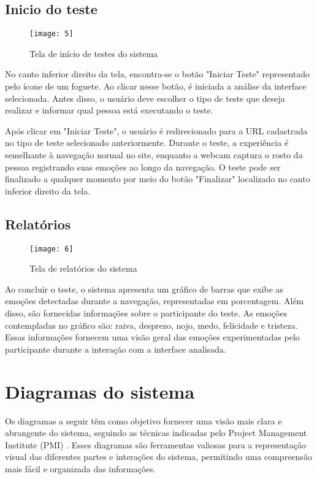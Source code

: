 \clearpage
\subsection{Inicio do teste}

\begin{figure}[h]
  \caption{Tela de início de testes do sistema}
  \centering
  \texttt{[image: 5]}
  \label{fig:5}
\end{figure}
\FloatBarrier

No canto inferior direito da tela, encontra-se o botão "Iniciar Teste" representado pelo ícone de um foguete. Ao clicar nesse botão, é iniciada a análise da interface selecionada. Antes disso, o usuário deve escolher o tipo de teste que deseja realizar e informar qual pessoa está executando o teste.

Após clicar em "Iniciar Teste", o usuário é redirecionado para a URL cadastrada no tipo de teste selecionado anteriormente. Durante o teste, a experiência é semelhante à navegação normal no site, enquanto a webcam captura o rosto da pessoa registrando suas emoções ao longo da navegação. O teste pode ser finalizado a qualquer momento por meio do botão "Finalizar" localizado no canto inferior direito da tela.

\subsection{Relatórios}

\begin{figure}[h]
  \caption{Tela de relatórios do sistema}
  \centering
  \texttt{[image: 6]}
  \label{fig:6}
\end{figure}
\FloatBarrier

Ao concluir o teste, o sistema apresenta um gráfico de barras que exibe as emoções detectadas durante a navegação, representadas em porcentagem. Além disso, são fornecidas informações sobre o participante do teste. As emoções contempladas no gráfico são: raiva, desprezo, nojo, medo, felicidade e tristeza. Essas informações fornecem uma visão geral das emoções experimentadas pelo participante durante a interação com a interface analisada.

\section{Diagramas do sistema}

Os diagramas a seguir têm como objetivo fornecer uma visão mais clara e abrangente do sistema, seguindo as técnicas indicadas pelo Project Management Institute (PMI) \cite{31}. Esses diagramas são ferramentas valiosas para a representação visual das diferentes partes e interações do sistema, permitindo uma compreensão mais fácil e organizada das informações.

